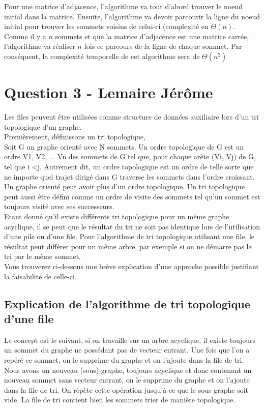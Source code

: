 \documentclass[10pt,a4paper]{article}
\begin{document}
Pour une matrice d'adjacence, l'algorithme va tout d'abord trouver le noeud initial dans la matrice. Ensuite, l'algorithme va devoir parcourir la ligne du noeud initial pour trouver les sommets voisins de celui-ci (complexité en $\Theta(n)$. Comme il y a $n$ sommets et que la matrice d'adjacence est une matrice carrée, l'algorithme va réaliser $n$ fois ce parcours de la ligne de chaque sommet. Par conséquent, la complexité temporelle de cet algorithme sera de $\Theta(n^{2})$

\section*{Question 3 - Lemaire Jérôme}
Les files peuvent être utilisées comme structure de données auxiliaire lors d'un tri topologique d'un graphe.\\


Premièrement, définissons un tri topologique, \\
Soit G un graphe orienté avec N sommets. Un ordre topologique de G est un ordre V1, V2, ... Vn des sommets de G tel que, pour chaque arête (Vi, Vj) de G, tel que i <j. Autrement dit, un ordre topologique est un ordre de telle sorte que ne importe quel trajet dirigé dans G traverse les sommets dans l'ordre croissant. Un graphe orienté peut avoir plus d'un ordre topologique.
Un tri topologique peut aussi être défini comme un ordre de visite des sommets tel qu'un sommet est toujours visité avec ses successeurs.\\

Etant donné qu'il existe différents tri topologique pour un même graphe acyclique, il se peut que le résultat du tri ne soit pas identique lors de l'utilisation d'une pile ou d'une file. Pour l'algorithme de tri topologique utilisant une file, le résultat peut différer pour un même arbre, par exemple si on ne démarre pas le tri par le même sommet. \\
Vous trouverez ci-dessous une brève explication d'une approche possible justifiant la faisabilité de celle-ci.\\
\subsection*{Explication de l'algorithme de tri topologique d'une file}
Le concept est le suivant, si on travaille sur un arbre acyclique, il existe toujours un sommet du graphe ne possédant pas de vecteur entrant. Une fois que l'on a repéré ce sommet, on le supprime du graphe et on l'ajoute dans la file de tri. Nous avons un nouveau (sous)-graphe, toujours acyclique et donc contenant un nouveau sommet sans vecteur entrant, on le supprime du graphe et on l'ajoute dans la file de tri. On répète cette opération jusqu'à ce que le sous-graphe soit vide. La file de tri contient bien les sommets trier de manière topologique.
\end{document}
